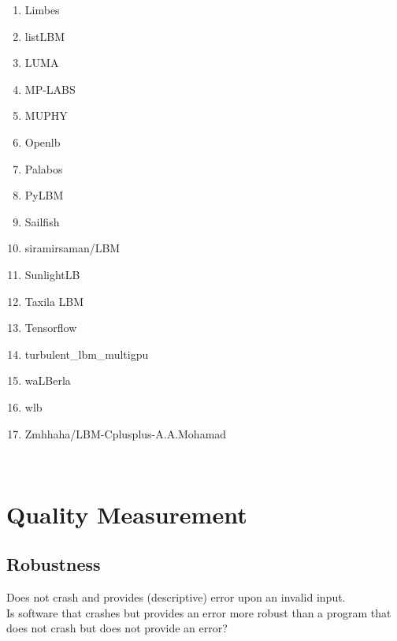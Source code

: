 \documentclass{article}
\begin{document}
\begin{enumerate}
	\item Limbes 
	
	\item listLBM 
	
	\item LUMA 
	
	\item MP-LABS 
	
	\item MUPHY 
	
	\item Openlb  
	
	\item Palabos 
	
	\item PyLBM 
	
	\item Sailfish 
	
	\item siramirsaman/LBM 
	
	\item SunlightLB 
	
	\item Taxila LBM 
	
	\item Tensorflow 
	
	\item turbulent\_lbm\_multigpu 
	
	\item waLBerla 
	
	\item wlb 
	
	\item Zmhhaha/LBM-Cplusplus-A.A.Mohamad 
	
\end{enumerate}

~\newpage
\section{Quality Measurement}
\subsection{Robustness}

Does not crash and provides (descriptive) error upon an invalid input.\\ 


Is software that crashes but provides an error more robust than a program that does not crash but does not provide an error?\\ 
\end{document}
